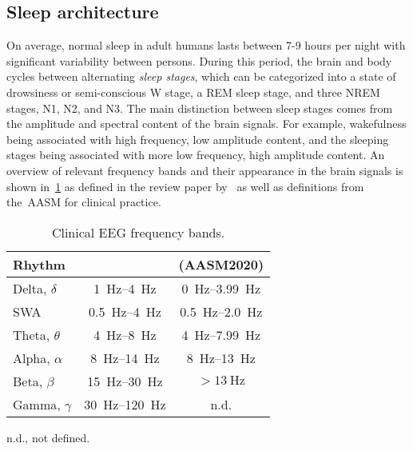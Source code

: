         \subsection{Sleep architecture}\label{sec:sleep-architecture}
            On average, normal sleep in adult humans lasts between 7-9 hours per night with significant variability between persons. 
            During this period, the brain and body cycles between alternating \textit{sleep stages}, which can be categorized into a state of drowsiness or semi-conscious \ac{W} stage, a \ac{REM} sleep stage, and three \ac{NREM} stages, \ac{N1}, \ac{N2}, and \ac{N3}.
            The main distinction between sleep stages comes from the amplitude and spectral content of the brain signals. 
            For example, wakefulness being associated with high frequency, low amplitude content, and the sleeping stages being associated with more low frequency, high amplitude content. 
            An overview of relevant frequency bands and their appearance in the brain signals is shown in~\cref{tab:eeg_rythms} as defined in the review paper by~\cite{Brown2012} as well as definitions from the~\ac{AASM} for clinical practice.
            \begin{table}[tb]
                \centering
            \begin{threeparttable}
                \caption[Clinical EEG frequency bands]{Clinical EEG frequency bands.}
                \label{tab:eeg_rythms}
                \begin{tabular}{@{}lcc@{}} \toprule
                    \textbf{Rhythm} & \textbf{\citet{Brown2012}} & \textbf{\citet{Berry2020} (\acs{AASM}2020)} \\ \midrule
                    Delta, $\delta$ & \SIrange{1}{4}{\hertz} & \SIrange{0}{3.99}{\hertz} \\
                    \Ac{SWA} & \SIrange{0.5}{4}{\hertz} & \SIrange{0.5}{2.0}{\hertz} \\
                    Theta, $\theta$ & \SIrange{4}{8}{\hertz} & \SIrange{4}{7.99}{\hertz} \\
                    Alpha, $\alpha$ & \SIrange{8}{14}{\hertz} & \SIrange{8}{13}{\hertz} \\
                    Beta, $\beta$ & \SIrange{15}{30}{\hertz} & $>\SI{13}{\hertz}$\\
                    Gamma, $\gamma$ & \SIrange{30}{120}{\hertz} & n.d.\\ \bottomrule
                \end{tabular}
                \begin{tablenotes}
                    \item n.d., not defined.
                \end{tablenotes}
            \end{threeparttable}
            \end{table}
            
